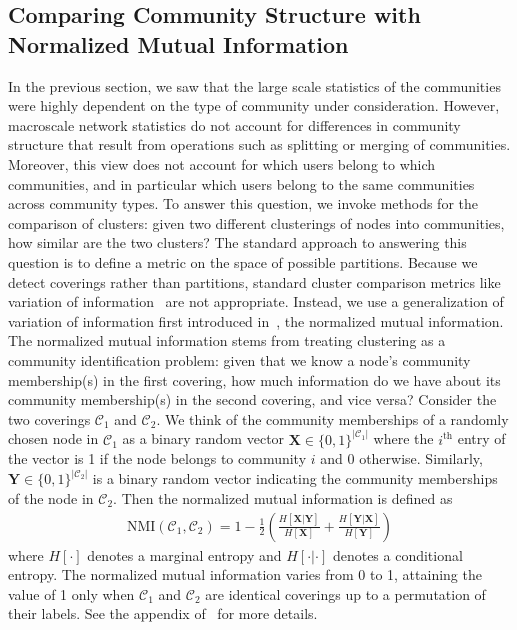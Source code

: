 \subsection{Comparing Community Structure with Normalized Mutual Information}

In the previous section, we saw that the large scale statistics of the communities were highly dependent on the type of community under consideration. However, macroscale network statistics do not account for differences in community structure that result from operations such as splitting or merging of communities. Moreover, this view does not account for which users belong to which communities, and in particular which users belong to the same communities across community types. To answer this question, we invoke methods for the comparison of clusters: given two different clusterings of nodes into communities, how similar are the two clusters? The standard approach to answering this question is to define a metric on the space of possible partitions.  
Because we detect coverings rather than partitions, standard cluster comparison metrics like variation of information~\cite{meilua2003comparing} are not appropriate. Instead, we use a generalization of variation of information first introduced in~\cite{Lancichinetti2009}, the normalized mutual information. The normalized mutual information stems from treating clustering as a community identification problem: given that we know a node's community membership(s) in the first covering, how much information do we have about its community membership(s) in the second covering, and vice versa? Consider the two coverings $\mathcal{C}_{1}$ and $\mathcal{C}_{2}.$ We think of the community memberships of a randomly chosen node in $\mathcal{C}_{1}$ as a binary random vector $\mathbf{X} \in \{0, 1\}^{|\mathcal{C}_{1}|}$ where the $i^{\text{th}}$ entry of the vector is 1 if the node belongs to community $i$ and 0 otherwise. Similarly, $\mathbf{Y} \in \{ 0, 1\}^{|\mathcal{C}_{2}|}$ is a binary random vector indicating the community memberships of the node in $\mathcal{C}_{2}$. Then the normalized mutual information is defined as
\begin{align}
	\text{NMI}(\mathcal{C}_{1}, \mathcal{C}_{2}) = 1 - \frac{1}{2} \left( \frac{H[\mathbf{X} | \mathbf{Y}]}{H[\mathbf{X}]} + \frac{H[\mathbf{Y} | \mathbf{X}]}{H[\mathbf{Y}]}\right)
\end{align}
where $H[\cdot]$ denotes a marginal entropy and $H[\cdot | \cdot]$ denotes a conditional entropy. The normalized mutual information varies from 0 to 1, attaining the value of 1 only when $\mathcal{C}_{1}$ and $\mathcal{C}_{2}$ are identical coverings up to a permutation of their labels. See the appendix of~\cite{Lancichinetti2009} for more details.

